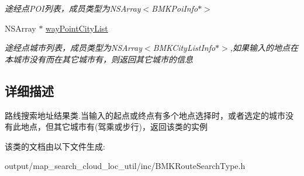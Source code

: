 \begin{DoxyCompactItemize}
\begin{DoxyCompactList}\small\item\em 途经点\+P\+O\+I列表，成员类型为\+N\+S\+Array$<$\+B\+M\+K\+Poi\+Info$\ast$$>$ \end{DoxyCompactList}\item 
\hypertarget{interface_b_m_k_suggest_addr_info_a3eeadb7f0eaaa514391a7f9565e9029a}{N\+S\+Array $\ast$ \hyperlink{interface_b_m_k_suggest_addr_info_a3eeadb7f0eaaa514391a7f9565e9029a}{way\+Point\+City\+List}}\label{interface_b_m_k_suggest_addr_info_a3eeadb7f0eaaa514391a7f9565e9029a}

\begin{DoxyCompactList}\small\item\em 途经点城市列表，成员类型为\+N\+S\+Array$<$\+B\+M\+K\+City\+List\+Info$\ast$$>$,如果输入的地点在本城市没有而在其它城市有，则返回其它城市的信息 \end{DoxyCompactList}\end{DoxyCompactItemize}


\subsection{详细描述}
路线搜索地址结果类.\+当输入的起点或终点有多个地点选择时，或者选定的城市没有此地点，但其它城市有(驾乘或步行)，返回该类的实例 

该类的文档由以下文件生成\+:\begin{DoxyCompactItemize}
\item 
output/map\+\_\+search\+\_\+cloud\+\_\+loc\+\_\+util/inc/B\+M\+K\+Route\+Search\+Type.\+h\end{DoxyCompactItemize}

